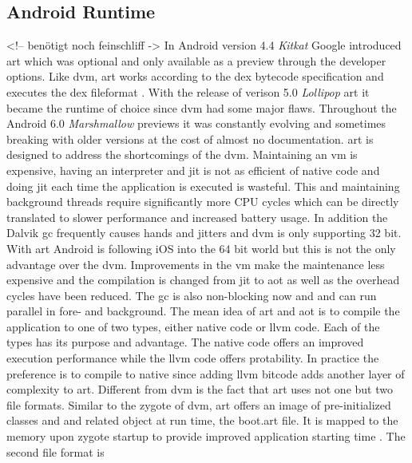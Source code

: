 \subsection{Android Runtime} \label{subsection:android-art}
<!-- benötigt noch feinschliff ->\newline\newline
In Android version 4.4 \textit{Kitkat} Google introduced \gls{art} which was optional and only available as a preview through the developer options.
Like \gls{dvm}, \gls{art} works according to the dex bytecode specification and executes the \gls{dex} fileformat \cite{androidArt}.
With the release of verison 5.0 \textit{Lollipop} \gls{art} it became the runtime of choice since \gls{dvm} had some major flaws.
Throughout the Android 6.0 \textit{Marshmallow} previews it was constantly evolving and sometimes breaking with older versions at the cost of almost no documentation.
\newline
\gls{art} is designed to address the shortcomings of the \gls{dvm}.
Maintaining an \gls{vm} is expensive, having an interpreter and \gls{jit} is not as efficient of native code and doing \gls{jit} each time the application is executed is wasteful.
This and maintaining background threads require significantly more CPU cycles which can be directly translated to slower performance and increased battery usage.
In addition the Dalvik \gls{gc} frequently causes hands and jitters and \gls{dvm} is only supporting 32 bit.
With \gls{art} Android is following iOS into the 64 bit world but this is not the only advantage over the \gls{dvm}.
Improvements in the \gls{vm} make the maintenance less expensive and the compilation is changed from \gls{jit} to \gls{aot} as well as the overhead cycles have been reduced.
The \gls{gc} is also non-blocking now and and can run parallel in fore- and background.
\newline
The mean idea of \gls{art} and \gls{aot} is to compile the application to one of two types, either native code or \gls{llvm} code.
Each of the types has its purpose and advantage.
The native code offers an improved execution performance while the \gls{llvm} code offers protability.
In practice the preference is to compile to native since adding \gls{llvm} bitcode adds another layer of complexity to \gls{art}.
\newline
Different from \gls{dvm} is the fact that \gls{art} uses not one but two file formats.
Similar to the zygote of \gls{dvm}, \gls{art} offers an image of pre-initialized classes and and related object at run time, the boot.art file.
It is mapped to the memory upon zygote startup to provide improved application starting time \cite{developersConfigureArt}.
The second file format is



